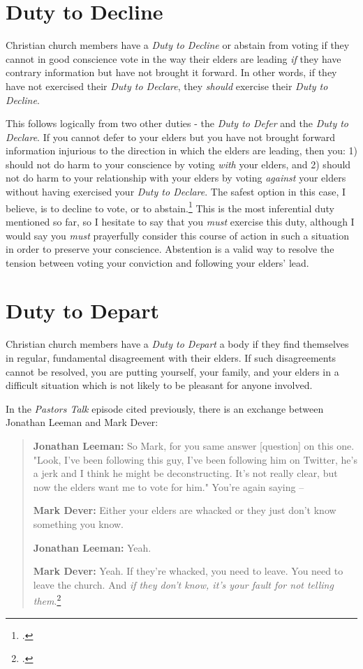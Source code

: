 \ifdefined\embedversion\newpage\fi
\section{Duty to Decline}
Christian church members have a \textit{Duty to Decline} or abstain from voting if they cannot in good conscience vote in the way their elders are leading \textit{if} they have contrary information but have not brought it forward.  In other words, if they have not exercised their \textit{Duty to Declare}, they \textit{should} exercise their \textit{Duty to Decline}.

This follows logically from two other duties - the \textit{Duty to Defer} and the \textit{Duty to Declare}. If you cannot defer to your elders but you have not brought forward information injurious to the direction in which the elders are leading, then you: 1) should not do harm to your conscience by voting \textit{with} your elders, and 2) should not do harm to your relationship with your elders by voting \textit{against} your elders without having exercised your \textit{Duty to Declare}.  The safest option in this case, I believe, is to decline to vote, or to abstain.\footcite{dever2024vote}  This is the most inferential duty mentioned so far, so I hesitate to say that you \textit{must} exercise this duty, although I would say you \textit{must} prayerfully consider this course of action in such a situation in order to preserve your conscience.  Abstention is a valid way to resolve the tension between voting your conviction and following your elders' lead.

\ifdefined\embedversion\newpage\fi
\section{Duty to Depart}
Christian church members have a \textit{Duty to Depart} a body if they find themselves in regular, fundamental disagreement with their elders.  If such disagreements cannot be resolved, you are putting yourself, your family, and your elders in a difficult situation which is not likely to be pleasant for anyone involved.

In the \textit{Pastors Talk} episode cited previously, there is an exchange between Jonathan Leeman and Mark Dever:
\begin{quote}
\textbf{Jonathan Leeman:}
So Mark, for you same answer [question] on this one. "Look, I've been following this guy, I've been following him on Twitter, he's a jerk and I think he might be deconstructing. It's not really clear, but now the elders want me to vote for him." You're again saying --

\textbf{Mark Dever:}
Either your elders are whacked or they just don't know something you know.

\textbf{Jonathan Leeman:}
Yeah.

\textbf{Mark Dever:}
Yeah. If they're whacked, you need to leave. You need to leave the church. And \textit{if they don't know, it's your fault for not telling them}.\footcite[emphasis mine]{dever2024vote}
\end{quote}

